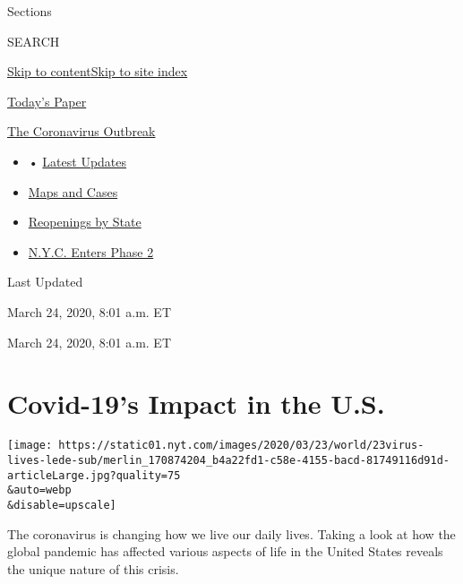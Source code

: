 Sections

SEARCH

\protect\hyperlink{site-content}{Skip to
content}\protect\hyperlink{site-index}{Skip to site index}

\href{https://myaccount.nytimes.com/auth/login?response_type=cookie\&client_id=vi}{}

\href{https://www.nytimes.com/section/todayspaper}{Today's Paper}

\href{https://www.nytimes.com/news-event/coronavirus}{The Coronavirus
Outbreak}

\begin{itemize}
\item
   •
  \href{https://www.nytimes.com/2020/06/22/world/coronavirus-updates.html}{Latest
  Updates}
\item
  \href{https://www.nytimes.com/interactive/2020/us/coronavirus-us-cases.html}{Maps
  and Cases}
\item
  \href{https://www.nytimes.com/interactive/2020/us/states-reopen-map-coronavirus.html}{Reopenings
  by State}
\item
  \href{https://www.nytimes.com/2020/06/22/nyregion/nyc-phase-2-reopening-coronavirus.html}{N.Y.C.
  Enters Phase 2}
\end{itemize}

Last Updated

March 24, 2020, 8:01 a.m. ET

March 24, 2020, 8:01 a.m. ET

\hypertarget{covid-19s-impact-in-the-us}{%
\section{Covid-19's Impact in the
U.S.}\label{covid-19s-impact-in-the-us}}

\texttt{[image: https://static01.nyt.com/images/2020/03/23/world/23virus-lives-lede-sub/merlin\_170874204\_b4a22fd1-c58e-4155-bacd-81749116d91d-articleLarge.jpg?quality=75\\\&auto=webp\\\&disable=upscale]}

The coronavirus is changing how we live our daily lives. Taking a look
at how the global pandemic has affected various aspects of life in the
United States reveals the unique nature of this crisis.

